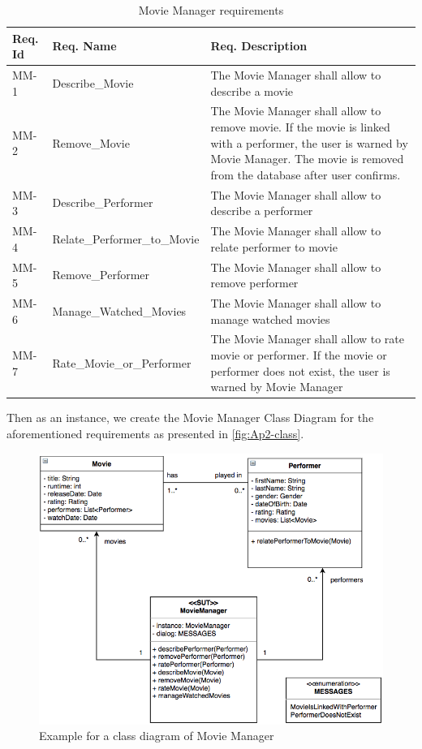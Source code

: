 \begin{table} [H] 
  \begin{center}
  \begin{small}
\caption{Movie Manager requirements}
\label{tab:MMreq}
\begin{tabular}{  m{1.3cm} | m{3.8cm} | m{8cm}  }
\hline
\textbf{Req. Id}& \textbf{Req. Name}&\textbf{Req. Description}   \\
\hline
MM-1& Describe\_Movie&The Movie Manager shall allow to describe a movie\\
\hline
MM-2&Remove\_Movie&The Movie Manager shall allow to remove movie. If the movie is linked with a performer, the user is warned by Movie Manager. The movie is removed from the database after user confirms.\\
\hline
MM-3&Describe\_Performer& The Movie Manager shall allow to describe a performer\\
\hline
MM-4&Relate\_Performer\_to\_Movie&The Movie Manager shall allow to relate performer to movie \\
\hline
MM-5&Remove\_Performer& The Movie Manager shall allow to remove performer\\
\hline
MM-6&Manage\_Watched\_Movies& The Movie Manager shall allow to manage watched movies\\
\hline
MM-7& Rate\_Movie\_or\_Performer& The Movie Manager shall allow to rate movie or performer. If the movie or performer does not exist, the user is warned by Movie Manager\\
\hline
\end{tabular}
\end{small}
 \end{center}
\end{table}

Then as an instance, we create the Movie Manager Class Diagram for the aforementioned requirements as presented in \autoref{fig:Ap2-class}.

\begin{figure} [H] 
\centering
\includegraphics[scale=0.42]{../images/Ap2-class} 
\caption{Example for a class diagram of Movie Manager}
\label{fig:Ap2-class}
\end{figure}

